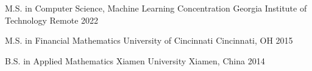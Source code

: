 


\begin{cvhonors}


	\cvhonor
	{M.S. in Computer Science, Machine Learning Concentration} %
	{Georgia Institute of Technology } %
	{Remote} %
	{2022} %


	\cvhonor
	{M.S. in Financial Mathematics} %
	{University of Cincinnati} %
	{Cincinnati, OH} %
	{2015} %

	\cvhonor
	{B.S. in Applied Mathematics} %
	{Xiamen University} %
	{Xiamen, China} %
	{2014}

\end{cvhonors}